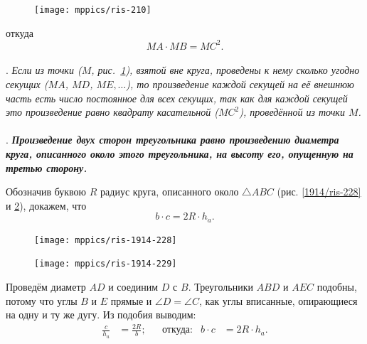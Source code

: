 \documentclass[oneside]{book}
\begin{document}
\begin{figure}
\centering
\texttt{[image: mppics/ris-210]}
\caption{}\label{1938/ris-210}
\end{figure}

\noindent
откуда
\[MA\cdot MB=MC^2.\]

\paragraph{}\label{1938/202}
\mbox{.}
\emph{Если из точки \emph{($M$, рис.~\ref{1938/ris-210}),} взятой вне круга, проведены к нему сколько угодно секущих ($MA$, $MD$, $ME,\dots$), то произведение каждой секущей на её внешнюю часть есть число постоянное для всех секущих, так как для каждой секущей это произведение равно квадрату касательной ($MC^2$), проведённой из точки $M$.}


\paragraph{}\label{1914/250}. \textbf{\emph{Произведение двух сторон треугольника равно произведению диаметра круга, описанного около этого треугольника, на высоту его, опущенную на третью сторону.}}

Обозначив буквою $R$ радиус круга, описанного около $\triangle ABC$ (рис. \ref{1914/ris-228} и \ref{1914/ris-229}), докажем, что
\[b\cdot c=2R\cdot h_a.\]

\begin{figure}[h!]
\begin{minipage}{.48\textwidth}
\centering
\texttt{[image: mppics/ris-1914-228]}
\caption{}\label{1914/ris-228}
\end{minipage}
\hfill
\begin{minipage}{.48\textwidth}
\centering
\texttt{[image: mppics/ris-1914-229]}
\caption{}\label{1914/ris-229}
\end{minipage}
\end{figure}

Проведём диаметр $AD$ и соединим $D$ с $B$.
Треугольники $ABD$ и $AEC$ подобны, потому что углы $B$ и $E$ прямые и $\angle D=\angle C$, как углы вписанные, опирающиеся на одну и ту же дугу.
Из подобия выводим:
\begin{align*}
\frac{c}{h_a}&=\frac{2R}{b};
&&\text{откуда:}
&b\cdot c&=2R\cdot h_a.
\end{align*}
\end{document}
